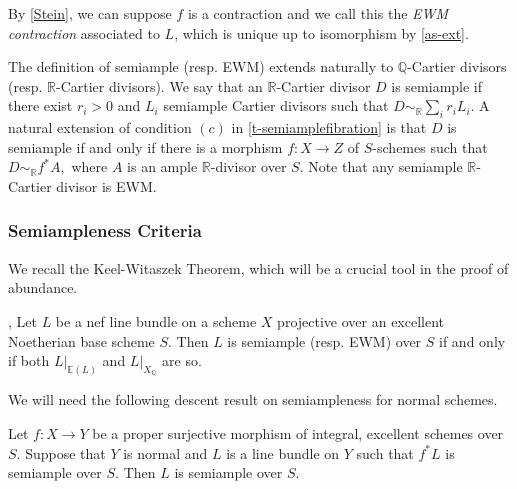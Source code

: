 	By \autoref{Stein}, we can suppose $f$ is a contraction and we call this the \emph{EWM contraction} associated to $L$, which is unique up to isomorphism by \autoref{as-ext}.
	
	The definition of semiample (resp. EWM) extends naturally to $\mathbb{Q}$-Cartier divisors (resp. $\mathbb{R}$-Cartier divisors).
	We say that an $\mathbb{R}$-Cartier divisor $D$ is semiample if there exist $r_i>0$ and $L_i$ semiample Cartier divisors such that $D \sim_{\mathbb{R}}\sum_i r_{i}L_{i}$. A natural extension of condition $(c)$ in \autoref{t-semiamplefibration} is that $D$ is semiample if and only if there is a morphism $f \colon X \to Z$ of $S$-schemes such that $D\sim_{\mathbb{R}} f^*A,$ where $A$ is an ample $\mathbb{R}$-divisor over $S$. Note that any semiample $\mathbb{R}$-Cartier divisor is EWM.
	

	\subsubsection{Semiampleness Criteria}
	
	We recall the Keel-Witaszek Theorem, which will be a crucial tool in the proof of abundance.

	
	\begin{theorem}\cite[Theorem 6.1]{witaszek2020keels}, \cite[Theorem 2.44]{bhatt2020}
		Let $L$ be a nef line bundle on a scheme $X$
		projective over an excellent Noetherian base scheme $S$. Then $L$ is semiample (resp. EWM) over $S$ if and only if both $L|_{\mathbb{E}(L)}$ and $L|_{X_{\mathbb{Q}}}$
		are so. 
	\end{theorem}
	
	We will need the following descent result on semiampleness for normal schemes.
	
	\begin{lemma}\label{pullback}
		
		Let $f \colon X \to Y$ be a proper surjective morphism of integral, excellent schemes over $S$. Suppose that $Y$ is normal and $L$  is a line bundle on $Y$ such that $f^{*}L$ is semiample over $S$.
		Then $L$ is semiample over $S$.
		
	\end{lemma}
	

